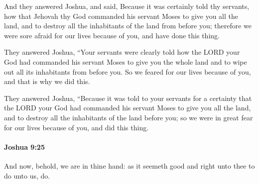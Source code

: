 			\begin{versebox}
					\item[BHS] 
					\item[ASV] And they answered Joshua, and said, Because it was certainly told thy servants, how that Jehovah thy God commanded his servant Moses to give you all the land, and to destroy all the inhabitants of the land from before you; therefore we were sore afraid for our lives because of you, and have done this thing.
					\item[NIV] They answered Joshua, “Your servants were clearly told how the LORD your God had commanded his servant Moses to give you the whole land and to wipe out all its inhabitants from before you. So we feared for our lives because of you, and that is why we did this.
					\item[NRSV] They answered Joshua, “Because it was told to your servants for a certainty that the LORD your God had commanded his servant Moses to give you all the land, and to destroy all the inhabitants of the land before you; so we were in great fear for our lives because of you, and did this thing.
			\end{versebox}

		\paragraph{Joshua 9:25} %
			\label{JOSHUA-9-25}

			And now, behold, we are in thine hand: as it seemeth good and right unto thee to do unto us, do.

